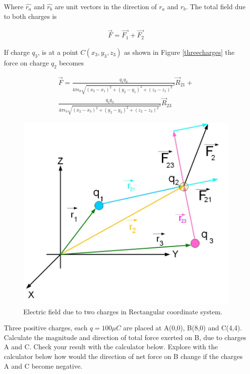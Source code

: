 \documentclass{ximera}
\begin{document}
Where $\hat{r_a}$ and $\hat{r_b}$ are unit vectors in the direction of $r_a$ and $r_b$. The total field due to both charges is


\begin{eqnarray}
\vec{F}=\vec{F_1} + \vec{F_2} 
\end{eqnarray}




If charge $q_3$, is at a point $C(x_3,y_3,z_3)$ as shown in Figure \ref{threecharges} the force on charge $q_2$  becomes

\begin{eqnarray}
\vec{F}= \frac{q_1 q_2}{4 \pi \epsilon_{0} {\sqrt{(x_2 - x_1)^2 +(y_2 - y_1)^2 +  (z_2 - z_1)^2}^3}} \vec{R}_{21} + \\ \nonumber
 \frac{q_2 q_3}{4 \pi \epsilon_{0} {\sqrt{(x_2 - x_3)^2 +(y_2 - y_3)^2 +(z_2 - z_3)^2}
}^3} \vec{R}_{23} 
\end{eqnarray}



\begin{figure}[htbp]
\begin{center}
\includegraphics[scale=0.5]{../jpg/twochargescartcoordFORCE.jpg}
\end{center}
\caption{Electric field due to two charges in  Rectangular coordinate system.}
\label{singlecharge}
\end{figure}



\begin{problem}

Three positive charges, each $q=100\mu C$ are placed at A(0,0), B(8,0) and C(4,4). Calculate the magnitude and direction of total force exerted on B, due to charges A and C. Check your result with the calculator below. Explore with the calculator below how would the direction of net force on B change if the charges A and C become negative. 
\begin{center}
\end{center}

\end{problem}
\end{document}
